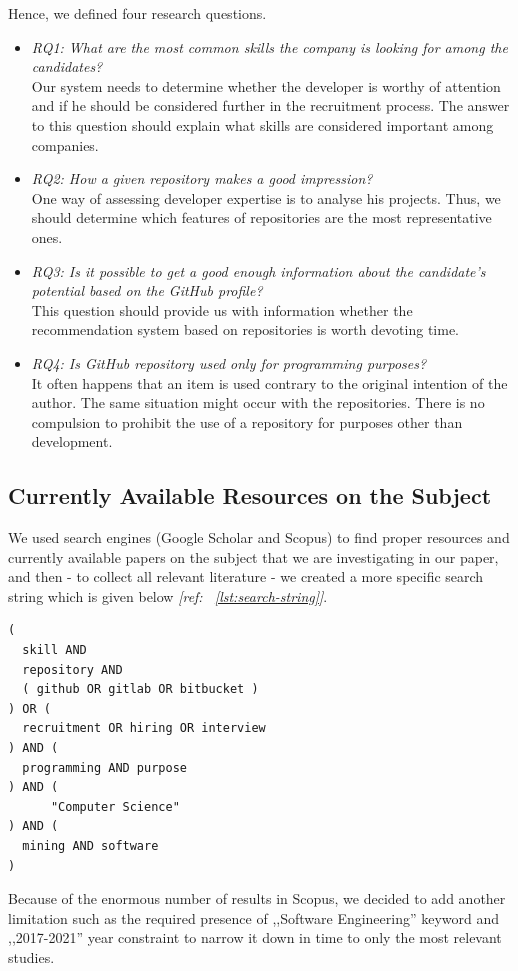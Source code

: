 Hence, we defined four research questions.
\begin{itemize}
\item{\emph{RQ1: What are the most common skills the company is looking for among the candidates?}\\
  Our system needs to determine whether the developer is worthy of attention and if he should be considered further in the recruitment process. The answer to this question should explain what skills are considered important among companies. }
\item{\emph{RQ2: How a given repository makes a good impression?}\\
  One way of assessing developer expertise is to analyse his projects. Thus, we should determine which features of repositories are the most representative ones.} 
\item{\emph{RQ3: Is it possible to get a good enough information about the candidate's potential based on the GitHub profile?}\\
  This question should provide us with information whether the recommendation system based on repositories is worth devoting time.} 
\item{\emph{RQ4: Is GitHub repository used only for programming purposes?}\\
  It often happens that an item is used contrary to the original intention of the author. The same situation might occur with the repositories. There is no compulsion to prohibit the use of a repository for purposes other than development.}
\end{itemize}

\subsection{Currently Available Resources on the Subject}
We used search engines (Google Scholar and Scopus) to find proper resources and currently available papers on the subject that we are investigating in our paper, and then - to collect all relevant literature - we created a more specific search string which is given below\textit{ [ref: ~\ref{lst:search-string}]}.

\newpage

\begin{lstlisting}[language=Query, label={lst:search-string}, caption=Search String Query]
(
  skill AND
  repository AND
  ( github OR gitlab OR bitbucket )
) OR (
  recruitment OR hiring OR interview
) AND (
  programming AND purpose
) AND (
      "Computer Science"
) AND (
  mining AND software
)
\end{lstlisting}
Because of the enormous number of results in Scopus, we decided to add another limitation such as the required presence of ,,Software Engineering'' keyword and ,,2017-2021'' year constraint to narrow it down in time to only the most relevant studies.

